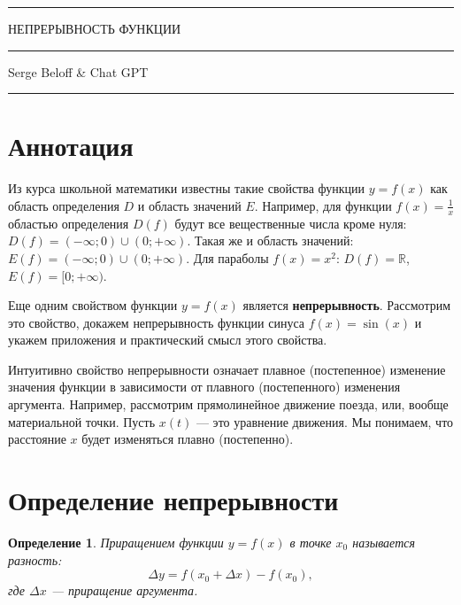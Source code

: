 \documentclass[a4paper, 12pt, final]{article}
\newtheorem{definition}{Определение}
\begin{document}
\begin{center}
    \scshape
    \hrule
    НЕПРЕРЫВНОСТЬ ФУНКЦИИ
    \vspace{0.7em} \hrule
\end{center}

\begin{flushleft}
    Serge Beloff \& Chat GPT
    \vspace{0.7em} \hrule
\end{flushleft}

\tableofcontents

\section{Аннотация}

Из курса школьной математики известны такие свойства функции $y=f(x)$ как область определения $D$ и область значений $E$.
Например, для функции $f(x)=\frac{1}{x}$ областью определения $D(f)$ будут все вещественные числа кроме нуля: $D(f) = (-\infty; 0) \cup (0; +\infty)$.
Такая же и область значений: $E(f) = (-\infty; 0) \cup (0; +\infty)$.
Для параболы $f(x)=x^2$: $D(f)=\mathbb{R}$, $E(f)=[0; +\infty)$.

Еще одним свойством функции $y=f(x)$ является \textbf{непрерывность}.
Рассмотрим это свойство, докажем непрерывность функции синуса $f(x)=\sin(x)$ и укажем приложения и практический смысл этого свойства.

Интуитивно свойство непрерывности означает плавное (постепенное) изменение значения функции в зависимости от плавного (постепенного) изменения аргумента.
Например, рассмотрим прямолинейное движение поезда, или, вообще материальной точки.
Пусть $x(t)$ --- это уравнение движения.
Мы понимаем, что расстояние $x$ будет изменяться плавно (постепенно).

\section{Определение непрерывности}

\begin{definition}
    Приращением функции $y=f(x)$ в точке $x_0$ называется разность:
    \begin{equation}
        \Delta y = f(x_0 + \Delta x) - f(x_0),
        \label{eq:delta_y}
    \end{equation}
    где $\Delta x$ --- приращение аргумента.
    \label{def:delta_y}
\end{definition}
\end{document}
